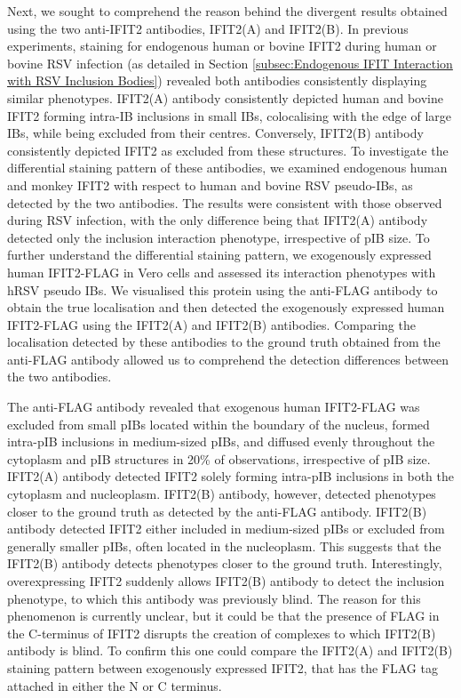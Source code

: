 Next, we sought to comprehend the reason behind the divergent results obtained using the two anti-IFIT2 antibodies, IFIT2(A) and IFIT2(B). In previous experiments, staining for endogenous human or bovine IFIT2 during human or bovine RSV infection (as detailed in Section \ref{subsec:Endogenous IFIT Interaction with RSV Inclusion Bodies}) revealed both antibodies consistently displaying similar phenotypes. IFIT2(A) antibody consistently depicted human and bovine IFIT2 forming intra-IB inclusions in small IBs, colocalising with the edge of large IBs, while being excluded from their centres. Conversely, IFIT2(B) antibody consistently depicted IFIT2 as excluded from these structures. To investigate the differential staining pattern of these antibodies, we examined endogenous human and monkey IFIT2 with respect to human and bovine RSV pseudo-IBs, as detected by the two antibodies. The results were consistent with those observed during RSV infection, with the only difference being that IFIT2(A) antibody detected only the inclusion interaction phenotype, irrespective of pIB size. To further understand the differential staining pattern, we exogenously expressed human IFIT2-FLAG in Vero cells and assessed its interaction phenotypes with hRSV pseudo IBs. We visualised this protein using the anti-FLAG antibody to obtain the true localisation and then detected the exogenously expressed human IFIT2-FLAG using the IFIT2(A) and IFIT2(B) antibodies. Comparing the localisation detected by these antibodies to the ground truth obtained from the anti-FLAG antibody allowed us to comprehend the detection differences between the two antibodies.

The anti-FLAG antibody revealed that exogenous human IFIT2-FLAG was excluded from small pIBs located within the boundary of the nucleus, formed intra-pIB inclusions in medium-sized pIBs, and diffused evenly throughout the cytoplasm and pIB structures in 20\% of observations, irrespective of pIB size. IFIT2(A) antibody detected IFIT2 solely forming intra-pIB inclusions in both the cytoplasm and nucleoplasm. IFIT2(B) antibody, however, detected phenotypes closer to the ground truth as detected by the anti-FLAG antibody. IFIT2(B) antibody detected IFIT2 either included in medium-sized pIBs or excluded from generally smaller pIBs, often located in the nucleoplasm. This suggests that the IFIT2(B) antibody detects phenotypes closer to the ground truth. Interestingly, overexpressing IFIT2 suddenly allows IFIT2(B) antibody to detect the inclusion phenotype, to which this antibody was previously blind. The reason for this phenomenon is currently unclear, but it could be that the presence of FLAG in the C-terminus of IFIT2 disrupts the creation of complexes to which IFIT2(B) antibody is blind. To confirm this one could compare the IFIT2(A) and IFIT2(B) staining pattern between exogenously expressed IFIT2, that has the FLAG tag attached in either the N or C terminus.


